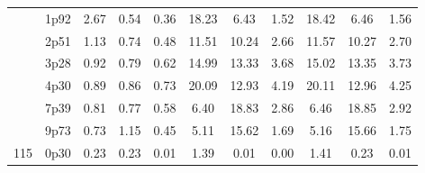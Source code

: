 \documentclass[12pt,A4paper]{article}
\begin{document}
\begin{table}[]
\begin{tabular}{lllllllllll}
\multicolumn{1}{|l|}{} & \multicolumn{1}{l|}{1p92} & \multicolumn{1}{c|}{2.67}        & \multicolumn{1}{c|}{0.54}         & \multicolumn{1}{c|}{0.36}        & \multicolumn{1}{c|}{18.23}         & \multicolumn{1}{c|}{6.43}        & \multicolumn{1}{c|}{1.52}        & \multicolumn{1}{c|}{18.42}        & \multicolumn{1}{c|}{6.46}        & \multicolumn{1}{c|}{1.56}         \\ \cline{2-11}
\multicolumn{1}{|l|}{} & \multicolumn{1}{l|}{2p51} & \multicolumn{1}{c|}{1.13}        & \multicolumn{1}{c|}{0.74}         & \multicolumn{1}{c|}{0.48}        & \multicolumn{1}{c|}{11.51}         & \multicolumn{1}{c|}{10.24}        & \multicolumn{1}{c|}{2.66}        & \multicolumn{1}{c|}{11.57}        & \multicolumn{1}{c|}{10.27}        & \multicolumn{1}{c|}{2.70}         \\ \cline{2-11}
\multicolumn{1}{|l|}{} & \multicolumn{1}{l|}{3p28} & \multicolumn{1}{c|}{0.92}        & \multicolumn{1}{c|}{0.79}         & \multicolumn{1}{c|}{0.62}        & \multicolumn{1}{c|}{14.99}         & \multicolumn{1}{c|}{13.33}        & \multicolumn{1}{c|}{3.68}        & \multicolumn{1}{c|}{15.02}        & \multicolumn{1}{c|}{13.35}        & \multicolumn{1}{c|}{3.73}         \\ \cline{2-11}
\multicolumn{1}{|l|}{} & \multicolumn{1}{l|}{4p30} & \multicolumn{1}{c|}{0.89}        & \multicolumn{1}{c|}{0.86}         & \multicolumn{1}{c|}{0.73}        & \multicolumn{1}{c|}{20.09}         & \multicolumn{1}{c|}{12.93}        & \multicolumn{1}{c|}{4.19}        & \multicolumn{1}{c|}{20.11}        & \multicolumn{1}{c|}{12.96}        & \multicolumn{1}{c|}{4.25}         \\ \cline{2-11}
\multicolumn{1}{|l|}{} & \multicolumn{1}{l|}{7p39} & \multicolumn{1}{c|}{0.81}        & \multicolumn{1}{c|}{0.77}         & \multicolumn{1}{c|}{0.58}        & \multicolumn{1}{c|}{6.40}         & \multicolumn{1}{c|}{18.83}        & \multicolumn{1}{c|}{2.86}        & \multicolumn{1}{c|}{6.46}        & \multicolumn{1}{c|}{18.85}        & \multicolumn{1}{c|}{2.92}         \\ \cline{2-11}
\multicolumn{1}{|l|}{} & \multicolumn{1}{l|}{9p73} & \multicolumn{1}{c|}{0.73}        & \multicolumn{1}{c|}{1.15}         & \multicolumn{1}{c|}{0.45}        & \multicolumn{1}{c|}{5.11}         & \multicolumn{1}{c|}{15.62}        & \multicolumn{1}{c|}{1.69}        & \multicolumn{1}{c|}{5.16}        & \multicolumn{1}{c|}{15.66}        & \multicolumn{1}{c|}{1.75}         \\ \hline
\multicolumn{1}{|l|}{\multirow{12}{*}{115}} & \multicolumn{1}{l|}{0p30} & \multicolumn{1}{c|}{0.23}        & \multicolumn{1}{c|}{0.23}         & \multicolumn{1}{c|}{0.01}        & \multicolumn{1}{c|}{1.39}         & \multicolumn{1}{c|}{0.01}        & \multicolumn{1}{c|}{0.00}         & \multicolumn{1}{c|}{1.41}         & \multicolumn{1}{c|}{0.23}         & \multicolumn{1}{c|}{0.01}         \\ \cline{2-11} 

\end{tabular}
\end{table}
\end{document}
